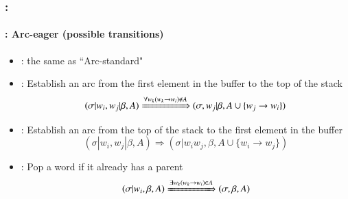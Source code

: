 \documentclass[xcolor=table]{beamer}
\begin{document}
\begin{frame}
	\frametitle{\insertshortsubtitle: \insertsection}
	\framesubtitle{\insertsubsection: Arc-eager (possible transitions)}

	\begin{itemize}
		\item {}: the same as ``Arc-standard"
		
		\item {}: Establish an arc from the first element in the buffer to the top of the stack
		\[ (\sigma|w_i, w_j|\beta, A) \xRightarrow{\forall w_k (w_k \rightarrow w_i) \notin A}  (\sigma, w_j|\beta, A \cup \{w_j \rightarrow w_i \}) \] 
		
		\item {}: Establish an arc from the top of the stack to the first element in the buffer
		\[ (\sigma|w_i, w_j|\beta, A) \Rightarrow  (\sigma|w_i w_j, \beta, A \cup \{w_i \rightarrow w_j \}) \] 
		
		\item {}: Pop a word if it already has a parent
		\[ (\sigma|w_i, \beta, A) \xRightarrow{\exists w_k (w_k \rightarrow w_i) \in A} (\sigma, \beta, A) \] 
	\end{itemize}

\end{frame}
\end{document}
